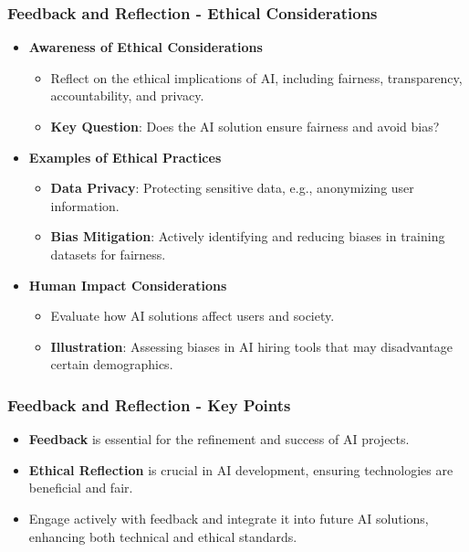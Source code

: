\documentclass[aspectratio=169]{beamer}
\begin{document}
\begin{frame}[fragile]
    \frametitle{Feedback and Reflection - Ethical Considerations}
    \begin{itemize}
        \item \textbf{Awareness of Ethical Considerations}
        \begin{itemize}
            \item Reflect on the ethical implications of AI, including fairness, transparency, accountability, and privacy.
            \item \textbf{Key Question}: Does the AI solution ensure fairness and avoid bias?
        \end{itemize}

        \item \textbf{Examples of Ethical Practices}
        \begin{itemize}
            \item \textbf{Data Privacy}: Protecting sensitive data, e.g., anonymizing user information.
            \item \textbf{Bias Mitigation}: Actively identifying and reducing biases in training datasets for fairness.
        \end{itemize}

        \item \textbf{Human Impact Considerations}
        \begin{itemize}
            \item Evaluate how AI solutions affect users and society.
            \item \textbf{Illustration}: Assessing biases in AI hiring tools that may disadvantage certain demographics.
        \end{itemize}
    \end{itemize}
\end{frame}

\begin{frame}[fragile]
    \frametitle{Feedback and Reflection - Key Points}
    \begin{itemize}
        \item \textbf{Feedback} is essential for the refinement and success of AI projects.
        \item \textbf{Ethical Reflection} is crucial in AI development, ensuring technologies are beneficial and fair.
        \item Engage actively with feedback and integrate it into future AI solutions, enhancing both technical and ethical standards.
    \end{itemize}
\end{frame}
\end{document}
